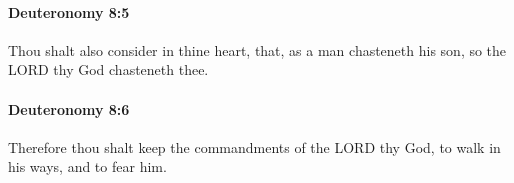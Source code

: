 		\paragraph{Deuteronomy 8:5} %
			\label{DEUTERONOMY-8-5}

			Thou shalt also consider in thine heart, that, as a man chasteneth his son, so the LORD thy God chasteneth thee.


		\paragraph{Deuteronomy 8:6} %
			\label{DEUTERONOMY-8-6}

			Therefore thou shalt keep the commandments of the LORD thy God, to walk in his ways, and to fear him.


